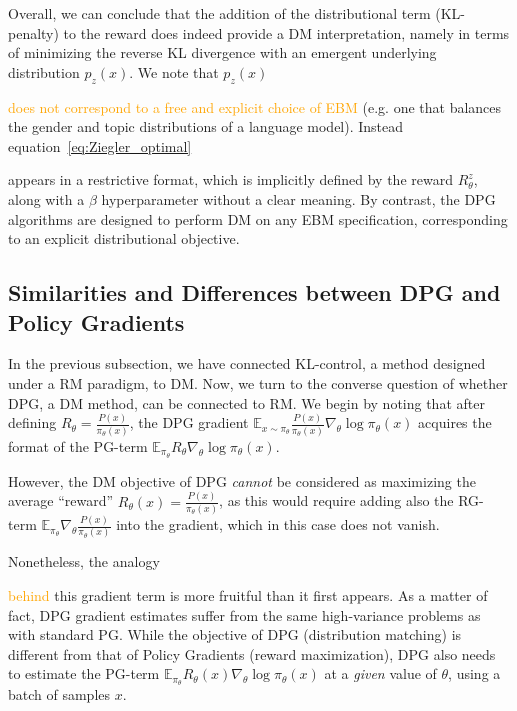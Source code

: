 Overall, we can conclude that the addition of the distributional term (KL-penalty) to the reward does indeed provide a DM interpretation, namely in terms of minimizing the reverse KL divergence with an emergent underlying distribution $p_{z}(x)$. We note that $p_{z}(x)$ 

\textcolor{orange}{does not correspond to a free and explicit choice of EBM} (e.g. one that balances the gender and topic distributions of a language model). Instead equation~\eqref{eq:Ziegler_optimal} 

appears in a restrictive format, which is implicitly defined by the reward $R^z_\theta$, along with a $\beta$ hyperparameter without a clear meaning. By contrast, the DPG algorithms are designed to perform DM on any EBM specification, corresponding to an explicit distributional objective.

\subsection{Similarities and Differences between DPG and Policy Gradients}

In the previous subsection, we have connected KL-control, a method designed under a RM paradigm, to DM. Now, we turn to the converse question of whether DPG, a DM method, can be connected to RM. We begin by noting that after defining $R_\theta = \frac{P(x)}{{\pi_\theta}(x)}$, the DPG gradient $\mathbb{E}_{x \sim {\pi_\theta}} \frac{P(x)}{{\pi_\theta}(x)} \nabla_\theta \log {\pi_\theta}(x)$ acquires the format of the PG-term $\mathbb{E}_{{\pi_\theta}} R_\theta \nabla_\theta \log {\pi_\theta}(x)$.

However, the DM objective of DPG \emph{cannot} be considered as maximizing the average ``reward'' $R_\theta(x) = \frac{P(x)}{{\pi_\theta}(x)}$, as this would require adding also the RG-term $\mathbb{E}_{{\pi_\theta}}\nabla_\theta \frac{P(x)}{{\pi_\theta}(x)}$ into the gradient, which in this case does not vanish. 

Nonetheless, the analogy 

\textcolor{orange}{behind}
this gradient term is more fruitful than it first appears. As a matter of fact, DPG gradient estimates suffer from the same high-variance problems as with standard PG. While the objective of DPG (distribution matching) is different from that of Policy Gradients (reward maximization), DPG also needs to estimate the PG-term $\mathbb{E}_{\pi_\theta} R_\theta(x) \nabla_\theta \log {\pi_\theta}(x)$ at a \emph{given} value of $\theta$, using a batch of samples $x$. 

